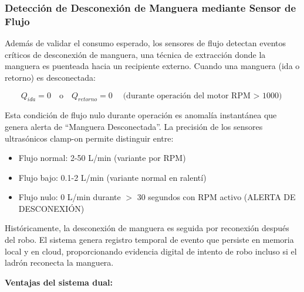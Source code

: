 \documentclass[twocolumn, 10pt]{article}
\begin{document}
\subsubsection*{Detección de Desconexión de Manguera mediante Sensor de Flujo}

Además de validar el consumo esperado, los sensores de flujo detectan eventos críticos de desconexión de manguera, una técnica de extracción donde la manguera es puenteada hacia un recipiente externo. Cuando una manguera (ida o retorno) es desconectada:

\begin{equation}
Q_{ida} = 0 \quad \text{o} \quad Q_{retorno} = 0 \quad \text{(durante operación del motor RPM $>$ 1000)}
\end{equation}

Esta condición de flujo nulo durante operación es anomalía instantánea que genera alerta de ``Manguera Desconectada''. La precisión de los sensores ultrasónicos clamp-on permite distinguir entre:
\begin{itemize}
  \item Flujo normal: 2-50 L/min (variante por RPM)
  \item Flujo bajo: 0.1-2 L/min (variante normal en ralentí)
  \item Flujo nulo: 0 L/min durante $>$ 30 segundos con RPM activo (ALERTA DE DESCONEXIÓN)
\end{itemize}

Históricamente, la desconexión de manguera es seguida por reconexión después del robo. El sistema genera registro temporal de evento que persiste en memoria local y en cloud, proporcionando evidencia digital de intento de robo incluso si el ladrón reconecta la manguera.

\textbf{Ventajas del sistema dual:}
\end{document}

